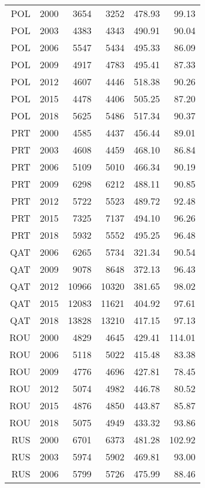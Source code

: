 \begin{longtable}{|r|r|r|r|r|r|}
    POL   & 2000  & 3654  & 3252  & 478.93 & 99.13 \\
    POL   & 2003  & 4383  & 4343  & 490.91 & 90.04 \\
    POL   & 2006  & 5547  & 5434  & 495.33 & 86.09 \\
    POL   & 2009  & 4917  & 4783  & 495.41 & 87.33 \\
    POL   & 2012  & 4607  & 4446  & 518.38 & 90.26 \\
    POL   & 2015  & 4478  & 4406  & 505.25 & 87.20 \\
    POL   & 2018  & 5625  & 5486  & 517.34 & 90.37 \\
    PRT   & 2000  & 4585  & 4437  & 456.44 & 89.01 \\
    PRT   & 2003  & 4608  & 4459  & 468.10 & 86.84 \\
    PRT   & 2006  & 5109  & 5010  & 466.34 & 90.19 \\
    PRT   & 2009  & 6298  & 6212  & 488.11 & 90.85 \\
    PRT   & 2012  & 5722  & 5523  & 489.72 & 92.48 \\
    PRT   & 2015  & 7325  & 7137  & 494.10 & 96.26 \\
    PRT   & 2018  & 5932  & 5552  & 495.25 & 96.48 \\
    QAT   & 2006  & 6265  & 5734  & 321.34 & 90.54 \\
    QAT   & 2009  & 9078  & 8648  & 372.13 & 96.43 \\
    QAT   & 2012  & 10966 & 10320 & 381.65 & 98.02 \\
    QAT   & 2015  & 12083 & 11621 & 404.92 & 97.61 \\
    QAT   & 2018  & 13828 & 13210 & 417.15 & 97.13 \\
    ROU   & 2000  & 4829  & 4645  & 429.41 & 114.01 \\
    ROU   & 2006  & 5118  & 5022  & 415.48 & 83.38 \\
    ROU   & 2009  & 4776  & 4696  & 427.81 & 78.45 \\
    ROU   & 2012  & 5074  & 4982  & 446.78 & 80.52 \\
    ROU   & 2015  & 4876  & 4850  & 443.87 & 85.87 \\
    ROU   & 2018  & 5075  & 4949  & 433.32 & 93.86 \\
    RUS   & 2000  & 6701  & 6373  & 481.28 & 102.92 \\
    RUS   & 2003  & 5974  & 5902  & 469.81 & 93.00 \\
    RUS   & 2006  & 5799  & 5726  & 475.99 & 88.46 \\

\end{longtable}
